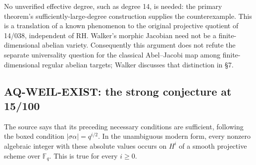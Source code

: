 No unverified effective degree, such as degree 14, is
needed: the primary theorem's sufficiently-large-degree
construction supplies the counterexample. This is a
translation of a known phenomenon to the original
projective quotient of 14/038, independent of RH.
Walker's morphic Jacobian
need not be a finite-dimensional abelian variety.
Consequently this argument does not refute the separate
universality question for the classical Abel--Jacobi
map among finite-dimensional regular abelian targets;
Walker discusses that distinction in \S7.

\subsection{AQ-WEIL-EXIST: the strong conjecture at 15/100}
The source says that its preceding necessary conditions
are sufficient, following the boxed condition
$|\sigma\alpha|=q^{i/2}$. In the unambiguous modern form,
every nonzero algebraic integer with these absolute values
occurs on $H^i$ of a smooth projective scheme over
$\mathbb F_q$. This is true for every $i\geq0$.

